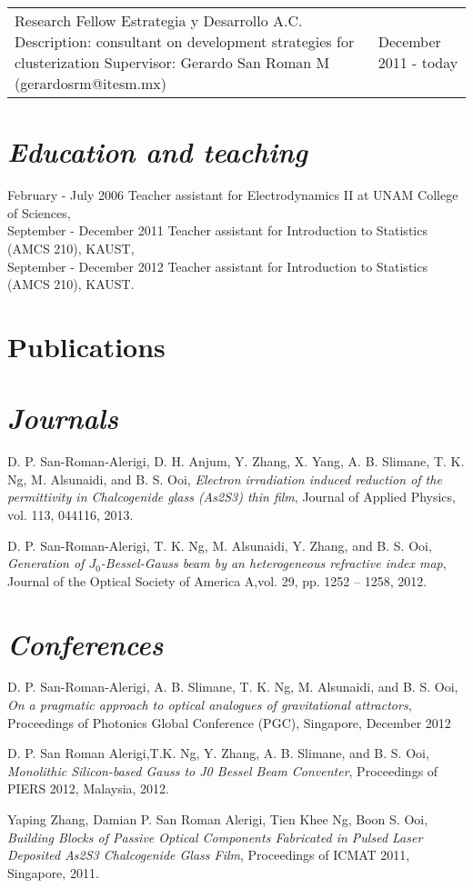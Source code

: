 \documentclass[margin,10pt]{res}
\newcommand{\subs}[1]{\normalfont\emph{\color{Black!90}#1}}
\newcommand{\secs}[1]{\normalsize{\section{\subs{#1}}}}
\begin{document}
\begin{tabular}{p{3.8in} l}
Research Fellow \newline Estrategia y Desarrollo A.C. \newline Description: consultant on development strategies for clusterization \newline Supervisor: Gerardo San Roman M (gerardosrm@itesm.mx) \newline & December 2011 - today
\end{tabular}


\secs{Education and teaching}
February - July 2006 Teacher assistant for Electrodynamics II at UNAM College of Sciences,\\
September - December 2011 Teacher assistant for Introduction to Statistics  (AMCS 210), KAUST,\\
September - December 2012 Teacher assistant for Introduction to Statistics  (AMCS 210), KAUST.\\



\section{Publications}
\secs{Journals}
D. P. San-Roman-Alerigi, D. H. Anjum, Y. Zhang, X. Yang, A. B. Slimane, T. K. Ng, M. Alsunaidi, and B. S. Ooi, \emph{Electron irradiation induced reduction of the permittivity in Chalcogenide glass (As2S3) thin film}, Journal of Applied Physics, vol. 113, 044116, 2013.

D. P. San-Roman-Alerigi, T. K. Ng, M. Alsunaidi, Y. Zhang, and B. S. Ooi, \emph{Generation of $J_0$-Bessel-Gauss beam by an heterogeneous refractive index map}, Journal of the Optical Society of America A,vol. 29, pp. 1252 -- 1258, 2012.



\secs{Conferences}
D. P. San-Roman-Alerigi, A. B. Slimane, T. K. Ng, M. Alsunaidi, and B. S. Ooi, \emph{On a pragmatic approach to optical analogues of gravitational attractors}, Proceedings of Photonics Global Conference (PGC), Singapore, December 2012

D. P. San Roman Alerigi,T.K. Ng,  Y. Zhang, A. B. Slimane, and B. S. Ooi, \emph{Monolithic Silicon-based Gauss to J0 Bessel Beam Conventer}, Proceedings of PIERS 2012, Malaysia, 2012.

Yaping Zhang, Damian P. San Roman Alerigi, Tien Khee Ng, Boon S. Ooi, \emph{Building Blocks of Passive Optical Components Fabricated in Pulsed Laser Deposited As2S3 Chalcogenide Glass Film}, Proceedings of ICMAT 2011, Singapore, 2011.
\end{document}
